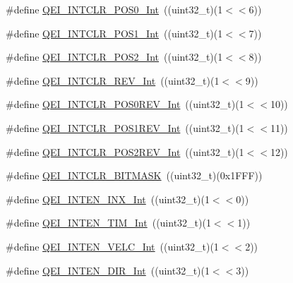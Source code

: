 \begin{DoxyCompactItemize}
\item 
\#define \hyperlink{group___q_e_i___private___macros_ga055e0b556f36d8c3bed0efbd0fddeee8}{\-Q\-E\-I\-\_\-\-I\-N\-T\-C\-L\-R\-\_\-\-P\-O\-S0\-\_\-\-Int}~((uint32\-\_\-t)(1$<$$<$6))
\item 
\#define \hyperlink{group___q_e_i___private___macros_ga5d064afd2653ec2bba4684a4640c2e9f}{\-Q\-E\-I\-\_\-\-I\-N\-T\-C\-L\-R\-\_\-\-P\-O\-S1\-\_\-\-Int}~((uint32\-\_\-t)(1$<$$<$7))
\item 
\#define \hyperlink{group___q_e_i___private___macros_ga5aaec5d48de965b2188b0b7fd5f01b3e}{\-Q\-E\-I\-\_\-\-I\-N\-T\-C\-L\-R\-\_\-\-P\-O\-S2\-\_\-\-Int}~((uint32\-\_\-t)(1$<$$<$8))
\item 
\#define \hyperlink{group___q_e_i___private___macros_ga51b9e2a221d3b61cfa2e4767e2e833b6}{\-Q\-E\-I\-\_\-\-I\-N\-T\-C\-L\-R\-\_\-\-R\-E\-V\-\_\-\-Int}~((uint32\-\_\-t)(1$<$$<$9))
\item 
\#define \hyperlink{group___q_e_i___private___macros_ga948a9c6847436f3a985b41d0dfbca679}{\-Q\-E\-I\-\_\-\-I\-N\-T\-C\-L\-R\-\_\-\-P\-O\-S0\-R\-E\-V\-\_\-\-Int}~((uint32\-\_\-t)(1$<$$<$10))
\item 
\#define \hyperlink{group___q_e_i___private___macros_ga0da0a40eae307d4f579a4d81951b8cb9}{\-Q\-E\-I\-\_\-\-I\-N\-T\-C\-L\-R\-\_\-\-P\-O\-S1\-R\-E\-V\-\_\-\-Int}~((uint32\-\_\-t)(1$<$$<$11))
\item 
\#define \hyperlink{group___q_e_i___private___macros_gae989566a21b1c32f17be717c83cd399c}{\-Q\-E\-I\-\_\-\-I\-N\-T\-C\-L\-R\-\_\-\-P\-O\-S2\-R\-E\-V\-\_\-\-Int}~((uint32\-\_\-t)(1$<$$<$12))
\item 
\#define \hyperlink{group___q_e_i___private___macros_gac0347bf0f287d930f3cfede8731e1256}{\-Q\-E\-I\-\_\-\-I\-N\-T\-C\-L\-R\-\_\-\-B\-I\-T\-M\-A\-S\-K}~((uint32\-\_\-t)(0x1\-F\-F\-F))
\item 
\#define \hyperlink{group___q_e_i___private___macros_gaa79897648d64d3640a5f4ec54774e449}{\-Q\-E\-I\-\_\-\-I\-N\-T\-E\-N\-\_\-\-I\-N\-X\-\_\-\-Int}~((uint32\-\_\-t)(1$<$$<$0))
\item 
\#define \hyperlink{group___q_e_i___private___macros_ga456a55634098e5d550471b2a4a78731d}{\-Q\-E\-I\-\_\-\-I\-N\-T\-E\-N\-\_\-\-T\-I\-M\-\_\-\-Int}~((uint32\-\_\-t)(1$<$$<$1))
\item 
\#define \hyperlink{group___q_e_i___private___macros_gacd30ec8a7938b765b03bbe626ee9fd9f}{\-Q\-E\-I\-\_\-\-I\-N\-T\-E\-N\-\_\-\-V\-E\-L\-C\-\_\-\-Int}~((uint32\-\_\-t)(1$<$$<$2))
\item 
\#define \hyperlink{group___q_e_i___private___macros_ga01f332cb45f8259c0a4072b6ee80fc7d}{\-Q\-E\-I\-\_\-\-I\-N\-T\-E\-N\-\_\-\-D\-I\-R\-\_\-\-Int}~((uint32\-\_\-t)(1$<$$<$3))
$$
\end{DoxyCompactItemize}
